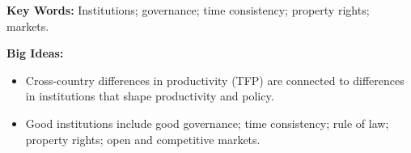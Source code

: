 \textbf{Key Words:} Institutions; governance; time consistency; property rights; markets.

\textbf{Big Ideas:}
\begin{itemize}
    \item Cross-country differences in productivity (TFP) are connected to differences in institutions that shape productivity and policy.
    \item Good institutions include good governance; time consistency; rule of law; property rights; open and competitive markets.
\end{itemize}
